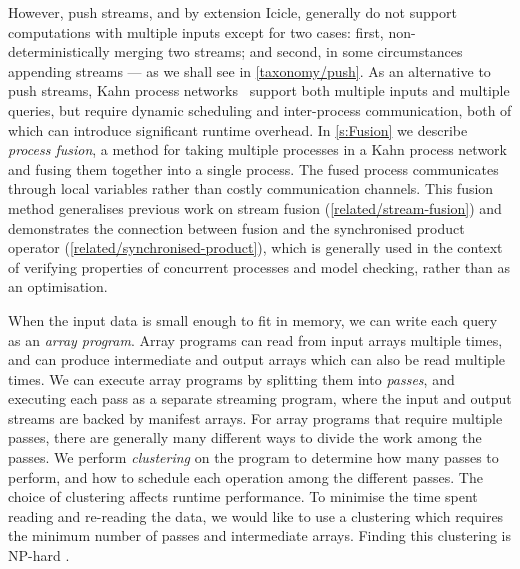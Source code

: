 However, push streams, and by extension Icicle, generally do not support computations with multiple inputs except for two cases: first, non-deterministically merging two streams; and second, in some circumstances appending streams --- as we shall see in \cref{taxonomy/push}.
As an alternative to push streams, Kahn process networks~\citep{kahn1976coroutines} support both multiple inputs and multiple queries, but require dynamic scheduling and inter-process communication, both of which can introduce significant runtime overhead.
In \cref{s:Fusion} we describe \emph{process fusion}, a method for taking multiple processes in a Kahn process network and fusing them together into a single process.
The fused process communicates through local variables rather than costly communication channels.
This fusion method generalises previous work on stream fusion (\cref{related/stream-fusion}) and demonstrates the connection between fusion and the synchronised product operator (\cref{related/synchronised-product}), which is generally used in the context of verifying properties of concurrent processes and model checking, rather than as an optimisation.


When the input data is small enough to fit in memory, we can write each query as an \emph{array program}.
Array programs can read from input arrays multiple times, and can produce intermediate and output arrays which can also be read multiple times.
We can execute array programs by splitting them into \emph{passes}, and executing each pass as a separate streaming program, where the input and output streams are backed by manifest arrays.
For array programs that require multiple passes, there are generally many different ways to divide the work among the passes.
We perform \emph{clustering} on the program to determine how many passes to perform, and how to schedule each operation among the different passes.
The choice of clustering affects runtime performance.
To minimise the time spent reading and re-reading the data, we would like to use a clustering which requires the minimum number of passes and intermediate arrays.
Finding this clustering is NP-hard \cite{darte1999complexity}.

